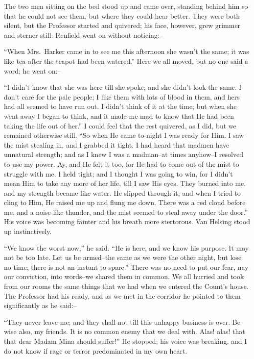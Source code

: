 \documentclass[12pt,openright]{book}
\begin{document}
The two men sitting on the bed stood up and came over, standing behind him so that he could not see them, but where they could hear better. They were both silent, but the Professor started and quivered; his face, however, grew grimmer and sterner still. Renfield went on without noticing:–

“When Mrs. Harker came in to see me this afternoon she wasn’t the same; it was like tea after the teapot had been watered.” Here we all moved, but no one said a word; he went on:–

“I didn’t know that she was here till she spoke; and she didn’t look the same. I don’t care for the pale people; I like them with lots of blood in them, and hers had all seemed to have run out. I didn’t think of it at the time; but when she went away I began to think, and it made me mad to know that He had been taking the life out of her.” I could feel that the rest quivered, as I did, but we remained otherwise still. “So when He came to-night I was ready for Him. I saw the mist stealing in, and I grabbed it tight. I had heard that madmen have unnatural strength; and as I knew I was a madman–at times anyhow–I resolved to use my power. Ay, and He felt it too, for He had to come out of the mist to struggle with me. I held tight; and I thought I was going to win, for I didn’t mean Him to take any more of her life, till I saw His eyes. They burned into me, and my strength became like water. He slipped through it, and when I tried to cling to Him, He raised me up and flung me down. There was a red cloud before me, and a noise like thunder, and the mist seemed to steal away under the door.” His voice was becoming fainter and his breath more stertorous. Van Helsing stood up instinctively.

“We know the worst now,” he said. “He is here, and we know his purpose. It may not be too late. Let us be armed–the same as we were the other night, but lose no time; there is not an instant to spare.” There was no need to put our fear, nay our conviction, into words–we shared them in common. We all hurried and took from our rooms the same things that we had when we entered the Count’s house. The Professor had his ready, and as we met in the corridor he pointed to them significantly as he said:–

“They never leave me; and they shall not till this unhappy business is over. Be wise also, my friends. It is no common enemy that we deal with. Alas! alas! that that dear Madam Mina should suffer!” He stopped; his voice was breaking, and I do not know if rage or terror predominated in my own heart.
\end{document}
